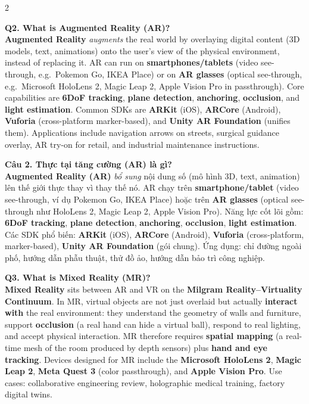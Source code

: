 \begin{paracol}{2}
\switchcolumn*

\textbf{Q2. What is Augmented Reality (AR)?}\\
\textbf{Augmented Reality} \textit{augments} the real world by overlaying digital content (3D models, text, animations) onto the user's view of the physical environment, instead of replacing it. AR can run on \textbf{smartphones/tablets} (video see-through, e.g.\ Pokemon Go, IKEA Place) or on \textbf{AR glasses} (optical see-through, e.g.\ Microsoft HoloLens 2, Magic Leap 2, Apple Vision Pro in passthrough). Core capabilities are \textbf{6DoF tracking}, \textbf{plane detection}, \textbf{anchoring}, \textbf{occlusion}, and \textbf{light estimation}. Common SDKs are \textbf{ARKit} (iOS), \textbf{ARCore} (Android), \textbf{Vuforia} (cross-platform marker-based), and \textbf{Unity AR Foundation} (unifies them). Applications include navigation arrows on streets, surgical guidance overlay, AR try-on for retail, and industrial maintenance instructions.

\switchcolumn

\textbf{Câu 2. Thực tại tăng cường (AR) là gì?}\\
\textbf{Augmented Reality (AR)} \textit{bổ sung} nội dung số (mô hình 3D, text, animation) lên thế giới thực thay vì thay thế nó. AR chạy trên \textbf{smartphone/tablet} (video see-through, ví dụ Pokemon Go, IKEA Place) hoặc trên \textbf{AR glasses} (optical see-through như HoloLens 2, Magic Leap 2, Apple Vision Pro). Năng lực cốt lõi gồm: \textbf{6DoF tracking}, \textbf{plane detection}, \textbf{anchoring}, \textbf{occlusion}, \textbf{light estimation}. Các SDK phổ biến: \textbf{ARKit} (iOS), \textbf{ARCore} (Android), \textbf{Vuforia} (cross-platform, marker-based), \textbf{Unity AR Foundation} (gói chung). Ứng dụng: chỉ đường ngoài phố, hướng dẫn phẫu thuật, thử đồ ảo, hướng dẫn bảo trì công nghiệp.

\switchcolumn*

\textbf{Q3. What is Mixed Reality (MR)?}\\
\textbf{Mixed Reality} sits between AR and VR on the \textbf{Milgram Reality--Virtuality Continuum}. In MR, virtual objects are not just overlaid but actually \textbf{interact with} the real environment: they understand the geometry of walls and furniture, support \textbf{occlusion} (a real hand can hide a virtual ball), respond to real lighting, and accept physical interaction. MR therefore requires \textbf{spatial mapping} (a real-time mesh of the room produced by depth sensors) plus \textbf{hand and eye tracking}. Devices designed for MR include the \textbf{Microsoft HoloLens 2}, \textbf{Magic Leap 2}, \textbf{Meta Quest 3} (color passthrough), and \textbf{Apple Vision Pro}. Use cases: collaborative engineering review, holographic medical training, factory digital twins.


\end{paracol}
